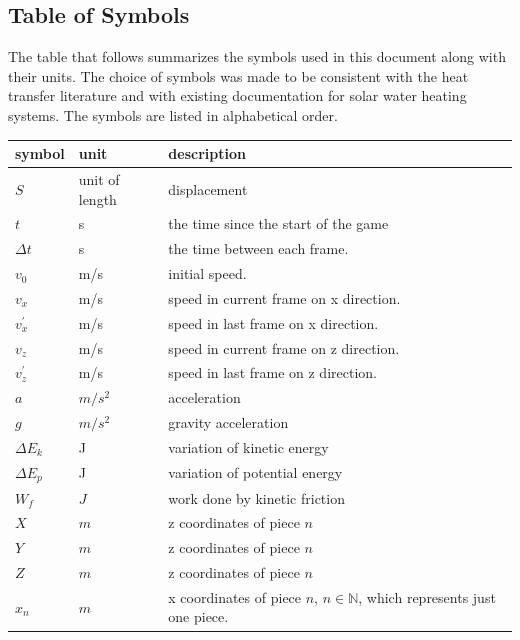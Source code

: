 \documentclass[12pt]{article}
\begin{document}
	\subsection{Table of Symbols}
	
	The table that follows summarizes the symbols used in this document along with
	their units.  The choice of symbols was made to be consistent with the heat
	transfer literature and with existing documentation for solar water heating
	systems.  The symbols are listed in alphabetical order.
	
	\renewcommand{\arraystretch}{1.2}
	\noindent \begin{longtable*}{l l p{12cm}} \toprule
		\textbf{symbol} & \textbf{unit} & \textbf{description}\\
		\midrule 
		$S$ & unit of length & displacement
		\\
		$t$ & \si[per-mode=symbol] s & the time since the start of the game
		\\
		$\Delta t$ & \si[per-mode=symbol] s & the time between each frame.
		\\
		$v_{0}$ & \si[per-mode=symbol] m/s & initial speed.
		\\  
		$v_{x}$ & \si[per-mode=symbol] m/s & speed in current frame on x direction.
		\\ 
		$v_{x}^{'}$ & \si[per-mode=symbol] m/s & speed in last frame on x direction.
		\\
		$v_{z}$ & \si[per-mode=symbol] m/s & speed in current frame on z direction.
		\\ 
		$v_{z}^{'}$ & \si[per-mode=symbol] m/s & speed in last frame on z direction.
		\\
		$a$ & $m/s^2$ & acceleration
		\\
		$g$ & $m/s^2$ & gravity acceleration
		\\
		$\Delta E_{k}$ & J & variation of kinetic energy
		\\
		$\Delta E_{p}$ & J & variation of potential energy
		\\
		$W_{f}$ & $J$ & work done by kinetic friction
		\\
		$X$ & $m$ & z coordinates of piece $n$
		\\
		$Y$ & $m$ & z coordinates of piece $n$
		\\
		$Z$ & $m$ & z coordinates of piece $n$
		\\
		$x_{n}$ & $m$ & x coordinates of piece $n$, $n \in \mathbb{N}$, which represents just one piece. 
\end{longtable*}
\end{document}
